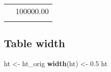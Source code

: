 \documentclass[]{article}
\newenvironment{Shaded}{\begin{snugshade}}{\end{snugshade}}
\newcommand{\KeywordTok}[1]{\textcolor[rgb]{0.13,0.29,0.53}{\textbf{{#1}}}}
\newcommand{\FloatTok}[1]{\textcolor[rgb]{0.00,0.00,0.81}{{#1}}}
\newcommand{\StringTok}[1]{\textcolor[rgb]{0.31,0.60,0.02}{{#1}}}
\newcommand{\NormalTok}[1]{{#1}}
\begin{document}
\begin{table}[h]
\begin{raggedright}
\begin{tabularx}{0.25\textwidth}{p{} p{}}
\hhline{>{\arrayrulecolor{black}}|>{\arrayrulecolor{black}}->{\arrayrulecolor{black}}|>{\arrayrulecolor{black}}-}
\arrayrulecolor{black}
\multicolumn{1}{|p{0.125\textwidth}|}{\raggedright\rule{0pt}{\baselineskip+4pt}\hspace*{4pt}Thyme\hspace*{4pt}\rule[-4pt]{0pt}{4pt}} & \multicolumn{1}{p{0.125\textwidth}|}{\raggedright\rule{0pt}{\baselineskip+4pt}\hspace*{4pt}100000.00\hspace*{4pt}\rule[-4pt]{0pt}{4pt}} \tabularnewline[-0.5pt]
\hhline{>{\arrayrulecolor{black}}|>{\arrayrulecolor{black}}->{\arrayrulecolor{black}}|>{\arrayrulecolor{black}}-}
\arrayrulecolor{black}
\end{tabularx}
\par\end{raggedright}
\end{table}

\FloatBarrier

\subsection{Table width}\label{table-width}

\begin{Shaded}
\begin{Highlighting}[]
\NormalTok{ht <-}\StringTok{ }\NormalTok{ht_orig}
\KeywordTok{width}\NormalTok{(ht) <-}\StringTok{ }\FloatTok{0.5}
\NormalTok{ht}
\end{Highlighting}
\end{Shaded}
\end{document}
